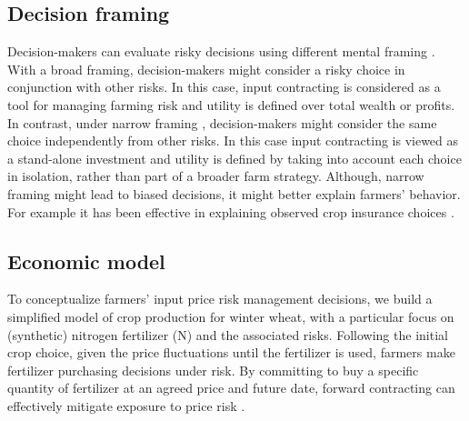 \documentclass[12pt,a4paper]{article}
\begin{document}
\subsection{Decision framing}

Decision-makers can evaluate risky decisions using different mental framing \citep{TverskyKahneman1981}. With a broad framing, decision-makers might consider a risky choice in conjunction with other risks. In this case, input contracting is considered as a tool for managing farming risk and utility is defined over total wealth or profits. In contrast, under narrow framing \citep{Barberis2006}, decision-makers might consider the same choice independently from other risks. In this case input contracting is viewed as a stand-alone investment and utility is defined by taking into account each choice in isolation, rather than part of a broader farm strategy. Although, narrow framing might lead to biased decisions, it might better explain farmers' behavior. For example it has been effective in explaining observed crop insurance choices \citep{Babcock2015}.

\subsection{Economic model}

To conceptualize farmers' input price risk management decisions, we build a simplified model of crop production for winter wheat, with a particular focus on (synthetic) nitrogen fertilizer (N) and the associated risks. Following the initial crop choice, given the price fluctuations until the fertilizer is used, farmers make fertilizer purchasing decisions under risk. By committing to buy a specific quantity of fertilizer at an agreed price and future date, forward contracting can effectively mitigate exposure to price risk \citep{Hardaker2015}.
\end{document}
